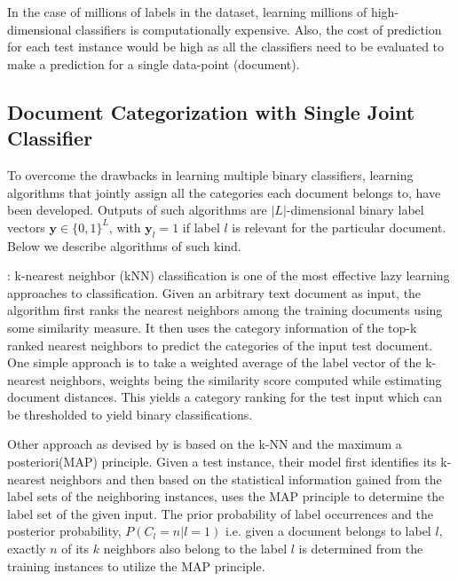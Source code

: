 In the case of millions of labels in the dataset, learning millions of high-dimensional classifiers is computationally expensive. Also, the cost of prediction for each test instance would be high as all the classifiers need to be evaluated to make a prediction for a single data-point (document). 


\subsection{Document Categorization with Single Joint Classifier}
To overcome the drawbacks in learning multiple binary classifiers, learning algorithms that jointly assign all the categories each document belongs to, have been developed. Outputs of such algorithms are $|L|$-dimensional binary label vectors $\boldsymbol{y} \in \{0, 1\}^{L}$, with $\boldsymbol{y}_{l} = 1$ if label $l$ is relevant for the particular document. Below we describe algorithms of such kind.

 : k-nearest neighbor (kNN) classification is one of the most effective lazy learning approaches to classification. Given an arbitrary text document as input, the algorithm first ranks the nearest neighbors among the training documents using some similarity measure. It then uses the category information of the top-k ranked nearest neighbors to predict the categories of the input test document. One simple approach is to take a weighted average of the label vector of the k-nearest neighbors, weights being the similarity score computed while estimating document distances. This yields a category ranking for the test input which can be thresholded to yield binary classifications.

Other approach as devised by \cite{zhang2007ml} is based on the k-NN and the maximum a posteriori(MAP) principle. Given a test instance, their model first identifies its k-nearest neighbors and then based on the statistical information gained from the label sets of the neighboring instances, uses the MAP principle to determine the label set of the given input. The prior probability of label occurrences and the posterior probability, $P(C_{l}=n | l=1)$ i.e. given a document belongs to label $l$, exactly $n$ of its $k$ neighbors also belong to the label $l$ is determined from the training instances to utilize the MAP principle.

